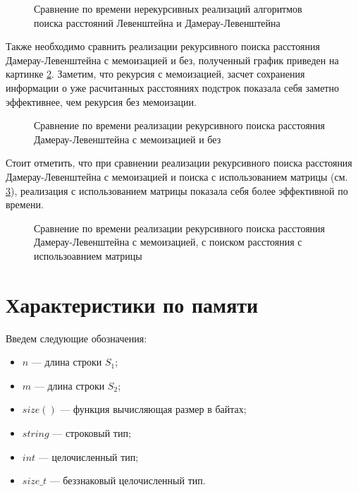 \begin{figure}[h]
	\centering
	
	\caption{Сравнение по времени нерекурсивных реализаций алгоритмов поиска расстояний Левенштейна и Дамерау-Левенштейна}
	\label{plt:time_matrix_cmp}
\end{figure}

Также необходимо сравнить реализации рекурсивного поиска расстояния Дамерау-Левенштейна с мемоизацией и без, полученный график приведен
на картинке \ref{plt:time_rec_cmp}. Заметим, что рекурсия с мемоизацией, засчет сохранения информации о уже расчитанных расстояниях подстрок
показала себя заметно эффективнее, чем рекурсия без мемоизации. 


\begin{figure}[h]
	\centering
	
	\caption{Сравнение по времени реализации рекурсивного поиска расстояния Дамерау-Левенштейна с мемоизацией и без}
	\label{plt:time_rec_cmp}
\end{figure}

Стоит отметить, что при сравнении реализации рекурсивного поиска расстояния Дамерау-Левенштейна с  мемоизацией и поиска
с использованием матрицы (см. \ref{plt:time_mat_rec_cmp}), реализация с использованием матрицы показала себя более эффективной
по времени. 

\begin{figure}[h]
	\centering
	
	\caption{Сравнение по времени реализации рекурсивного поиска расстояния Дамерау-Левенштейна с  мемоизацией, с поиском
	расстояния с использоавнием матрицы}
	\label{plt:time_mat_rec_cmp}
\end{figure}


\section{Характеристики по памяти}

Введем следующие обозначения:
\begin{itemize}
	\item$n$ --- длина строки $S_{1}$;
	\item$m$ --- длина строки $S_{2}$;
	\item$size()$ --- функция вычисляющая размер в байтах;
	\item $string$ --- строковый тип;
	\item $int$ --- целочисленный тип;
	\item $size\_t$ --- беззнаковый целочисленный тип.
\end{itemize}

